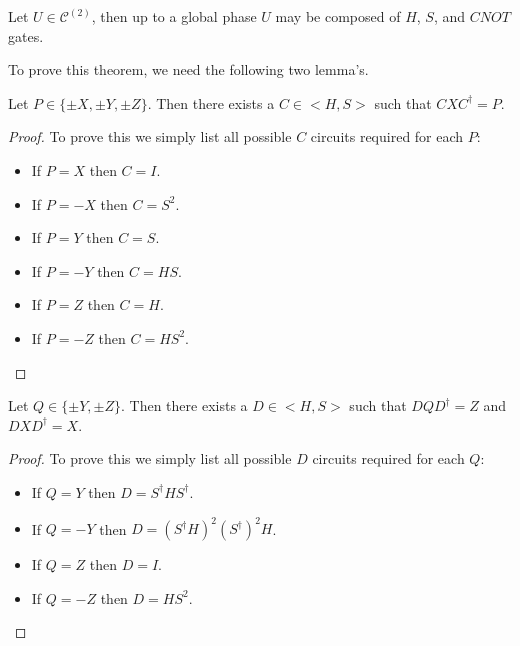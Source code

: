 \documentclass[12pt]{dalthesis}
\begin{document}
\begin{theorem}
\label{HSCNOT}
Let $U \in \mathcal{C}^{(2)}$, then up to a global phase $U$ may be composed of $H$, $S$, and $CNOT$ gates.
\end{theorem}

To prove this theorem, we need the following two lemma's.

\begin{lemma}
\label{ConjX}
Let $P \in \{\pm X, \pm Y, \pm Z \}$. Then there exists a $C \in <H, S>$ such that $CXC^\dag = P$.
\end{lemma}
\begin{proof}
To prove this we simply list all possible $C$ circuits required for each $P$:
\begin{itemize}
\item If $P = X$ then $C = I$.
\item If $P = -X$ then $C = S^2$.
\item If $P = Y$ then $C = S$.
\item If $P = -Y$ then $C = HS$.
\item If $P = Z$ then $C = H$.
\item If $P = -Z$ then $C = HS^2$.
\end{itemize}
\end{proof}

\begin{lemma}
\label{ConjZ}
Let $Q \in \{\pm Y, \pm Z \}$. Then there exists a $D \in <H, S>$ such that $DQD^\dag = Z$ and $DXD^\dag = X$.
\end{lemma}
\begin{proof}
To prove this we simply list all possible $D$ circuits required for each $Q$:
\begin{itemize}
\item If $Q = Y$ then $D = S^\dag HS^\dag$.
\item If $Q = -Y$ then $D = (S^\dag H)^2 (S^\dag)^2 H$.
\item If $Q = Z$ then $D = I$.
\item If $Q = -Z$ then $D = HS^2$.
\end{itemize}
\end{proof}
\end{document}
